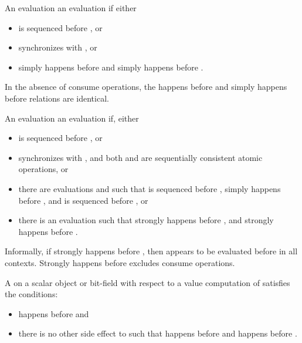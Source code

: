 \pnum
An evaluation   an evaluation 
if either
\begin{itemize}
\item {} is sequenced before , or
\item {} synchronizes with , or
\item {} simply happens before  and
 simply happens before .
\end{itemize}
\begin{note}
In the absence of consume operations,
the happens before and simply happens before relations are identical.
\end{note}

\pnum
An evaluation  
an evaluation  if, either
\begin{itemize}
\item {} is sequenced before , or
\item {} synchronizes with , and
both  and  are
sequentially consistent atomic operations, or
\item there are evaluations  and 
such that  is sequenced before ,
 simply happens before , and
 is sequenced before , or
\item there is an evaluation  such that
 strongly happens before , and
 strongly happens before .
\end{itemize}
\begin{note}
Informally, if  strongly happens before ,
then  appears to be evaluated before 
in all contexts. Strongly happens before excludes consume operations.
\end{note}

\pnum
A   on a scalar object or bit-field 
with respect to a value computation  of  satisfies the
conditions:
\begin{itemize}
\item {} happens before  and
\item there is no other
%
side effect  to  such that 
happens before  and  happens before .
\end{itemize}

